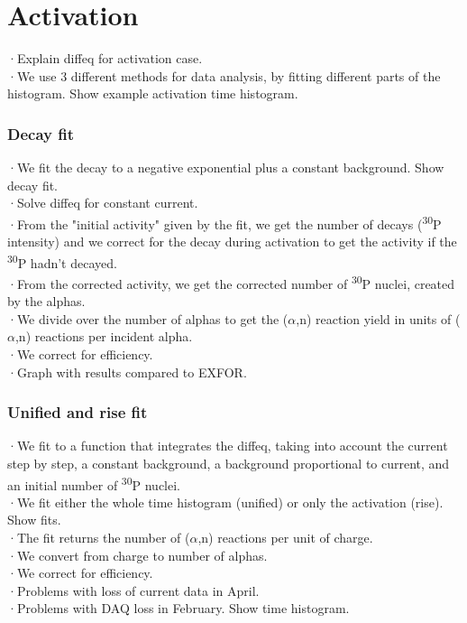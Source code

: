 \documentclass[a4paper,12pt]{report}
\newcommand{\an}{($\alpha$,n) }
\newcommand{\Piso}{\textsuperscript{30}P }
\begin{document}
\section{Activation}
·Explain diffeq for activation case.\\
·We use 3 different methods for data analysis, by fitting different parts of the histogram. Show example activation time histogram.\\

\subsubsection{Decay fit}
·We fit the decay to a negative exponential plus a constant background. Show decay fit.\\
·Solve diffeq for constant current.\\
·From the "initial activity" given by the fit, we get the number of decays (\Piso intensity) and we correct for the decay during activation to get the activity if the \Piso hadn't decayed.\\
·From the corrected activity, we get the corrected number of \Piso nuclei, created by the alphas.\\
·We divide over the number of alphas to get the \an reaction yield in units of \an reactions per incident alpha.\\
·We correct for efficiency.\\

·Graph with results compared to EXFOR.\\

\subsubsection{Unified and rise fit}
·We fit to a function that integrates the diffeq, taking into account the current step by step, a constant background, a background proportional to current, and an initial number of \Piso nuclei.\\
·We fit either the whole time histogram (unified) or only the activation (rise). Show fits.\\
·The fit returns the number of \an reactions per unit of charge.\\
·We convert from charge to number of alphas.\\
·We correct for efficiency.\\

·Problems with loss of current data in April.\\
·Problems with DAQ loss in February. Show time histogram.\\
\end{document}
